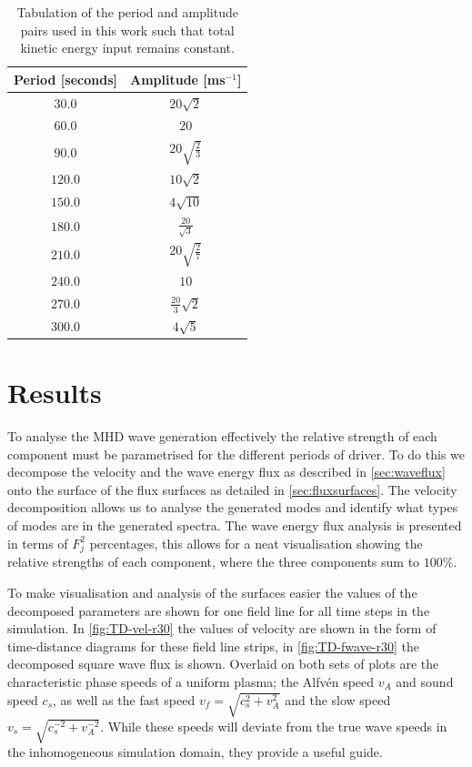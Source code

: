 \documentclass[a4paper,12pt,fourier,authoryear,custommargin]{Classes/PhDThesisPSnPDF}
\begin{document}
\begin{table}
    \centering
    \begin{tabular}{cc}
        Period [seconds] & Amplitude [ms$^{-1}$] 	\\ \hline
        $30.0$           & $20\sqrt{2}$           	\\[2ex]
        $60.0$           & $20$  		            \\[2ex]
        $90.0$           & $20\sqrt{\frac{2}{3}}$  \\[2ex]
        $120.0$          & $10\sqrt{2}$        	\\[2ex]
        $150.0$          & $4\sqrt{10}$            \\[2ex]
        $180.0$          & $\frac{20}{\sqrt{3}}$   \\[2ex]
        $210.0$          & $20\sqrt{\frac{2}{7}}$  \\[2ex]
        $240.0$          & $10$                 	\\[2ex]
        $270.0$          & $\frac{20}{3}\sqrt{2}$  \\[2ex]
        $300.0$          & $4\sqrt{5}$           	\\[2ex]
    \end{tabular}
    \caption{Tabulation of the period and amplitude pairs used in this work such that total kinetic energy input remains constant.}
    \label{tab:period-amp}
\end{table}

\section{Results}\label{subsec:results}

To analyse the MHD wave generation effectively the relative strength of each component must be parametrised for the different periods of driver.
To do this we decompose the velocity and the wave energy flux as described in \cref{sec:waveflux} onto the surface of the flux surfaces as detailed in \cref{sec:fluxsurfaces}.
The velocity decomposition allows us to analyse the generated modes and identify what types of modes are in the generated spectra.
The wave energy flux analysis is presented in terms of $F^2_j$ percentages, this allows for a neat visualisation showing the relative strengths of each component, where the three components sum to $100\%$.

To make visualisation and analysis of the surfaces easier the values of the decomposed parameters are shown for one field line for all time steps in the simulation.
In \cref{fig:TD-vel-r30} the values of velocity are shown in the form of time-distance diagrams for these field line strips, in \cref{fig:TD-fwave-r30} the decomposed square wave flux is shown. Overlaid on both sets of plots are the characteristic phase speeds of a uniform plasma; the Alfv\'en speed $v_A$ and sound speed $c_s$, as well as the fast speed $v_f = \sqrt{c_s^2 + v_A^2}$ and the slow speed $v_s = \sqrt{c_s^{-2} + v_A^{-2}}$.
While these speeds will deviate from the true wave speeds in the inhomogeneous simulation domain, they provide a useful guide.
\end{document}

